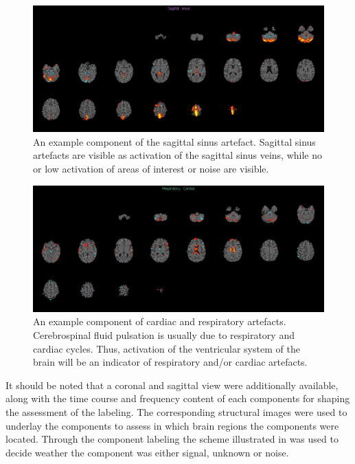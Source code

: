 \begin{figure}[H]                 
	\includegraphics[width=.85\textwidth]{figures/bMethods/sag_sinus}  
	\caption{An example component of the sagittal sinus artefact. Sagittal sinus artefacts are visible as activation of the sagittal sinus veins, while no or low activation of areas of interest or noise are visible.}
	\label{fig:meth:sinus} 
\end{figure}


\begin{figure}[H]                 
	\includegraphics[width=.85\textwidth]{figures/bMethods/card_resp}  
	\caption{An example component of cardiac and respiratory artefacts. Cerebrospinal fluid pulsation is usually due to respiratory and cardiac cycles. Thus, activation of the ventricular system of the brain will be an indicator of respiratory and/or cardiac artefacts.}
	\label{fig:meth:phys} 
\end{figure}
 It should be noted that a coronal and sagittal view were additionally available, along with the time course and frequency content of each components for shaping the assessment of the labeling. The corresponding structural images were used to underlay the components to assess in which brain regions the components were located. Through the component labeling the scheme illustrated in  was used to decide weather the component was either signal, unknown or noise. 
 
